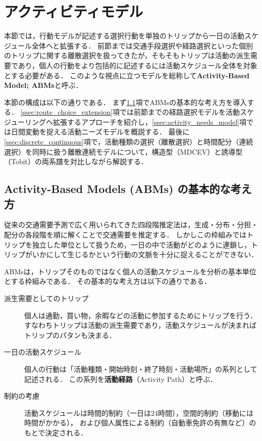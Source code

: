 
\section{アクティビティモデル}\label{sec:activity_models}
本節では，行動モデルが記述する選択行動を単独のトリップから一日の活動スケジュール全体へと拡張する．
前節までは交通手段選択や経路選択といった個別のトリップに関する離散選択を扱ってきたが，そもそもトリップは活動の派生需要であり，個人の行動をより包括的に記述するには活動スケジュール全体を対象とする必要がある．
このような視点に立つモデルを総称して\textbf{Activity-Based Model; ABMs}と呼ぶ．

本節の構成は以下の通りである．
まず\ref{ssec:abms_basic}項でABMsの基本的な考え方を導入する．
\ref{ssec:route_choice_extension}項では前節までの経路選択モデルを活動スケジューリングへ拡張するアプローチを紹介し，\ref{ssec:activity_needs_model}項では日間変動を捉える活動ニーズモデルを概説する．
最後に\ref{ssec:discrete_continuous}項で，活動種類の選択（離散選択）と時間配分（連続選択）を同時に扱う離散連続モデルについて，構造型（MDCEV）と誘導型（Tobit）の両系譜を対比しながら解説する．

\subsection{Activity-Based Models (ABMs) の基本的な考え方}\label{ssec:abms_basic}

従来の交通需要予測で広く用いられてきた四段階推定法は，生成・分布・分担・配分の各段階を順に解くことで交通需要を推定する．
しかしこの枠組みではトリップを独立した単位として扱うため，一日の中で活動がどのように連鎖し，トリップがいかにして生じるかという行動の文脈を十分に捉えることができない．

ABMsは，トリップそのものではなく個人の活動スケジュールを分析の基本単位とする枠組みである．
その基本的な考え方は以下の通りである．

\begin{description}
  \item[派生需要としてのトリップ]
    個人は通勤，買い物，余暇などの活動に参加するためにトリップを行う．
    すなわちトリップは活動の派生需要であり，活動スケジュールが決まればトリップのパタンも決まる．

  \item[一日の活動スケジュール]
    個人の行動は「活動種類・開始時刻・終了時刻・活動場所」の系列として記述される．
    この系列を\textbf{活動経路}（Activity Path）と呼ぶ．

  \item[制約の考慮]
    活動スケジュールは時間的制約（一日は24時間），空間的制約（移動には時間がかかる），
    および個人属性による制約（自動車免許の有無など）のもとで決定される．
\end{description}

